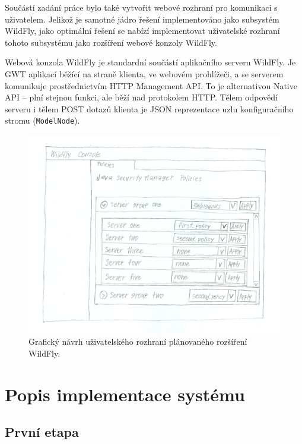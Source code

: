 Součástí zadání práce bylo také vytvořit webové rozhraní pro komunikaci s uživatelem. Jelikož je samotné jádro řešení implementováno jako subsystém WildFly, jako optimální řešení se nabízí implementovat uživatelské rozhraní tohoto subsystému jako rozšíření webové konzoly WildFly.

Webová konzola WildFly je standardní součástí aplikačního serveru WildFly. Je GWT aplikací běžící na straně klienta, ve webovém prohlížeči, a se serverem komunikuje prostřednictvím HTTP Management API. To je alternativou Native API -- plní stejnou funkci, ale běží nad protokolem HTTP. Tělem odpovědí serveru i tělem POST dotazů klienta je JSON reprezentace uzlu konfiguračního stromu ({\tt ModelNode}). \cite{WildFlyManagementAPIreference}

\begin{figure}[ht]
  \centering
  \includegraphics[width=14cm]{fig/mockup}
  \caption{Grafický návrh uživatelského rozhraní plánovaného rozšíření WildFly.}
\end{figure}

\chapter{Popis implementace systému} \label{implementace}

\section{První etapa}

